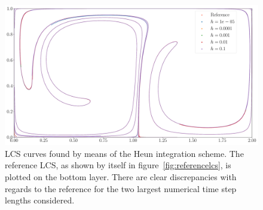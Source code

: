 \begin{figure}[htpb]
    \centering
    \includegraphics[width=0.8\linewidth]{figures/lcs_figures/rk2.pdf}
    \caption[LCS curves found by means of the Heun integration scheme]{
        LCS curves found by means of the Heun integration scheme. The
        reference LCS, as shown by itself in figure~\ref{fig:referencelcs},
        is plotted on the bottom layer. There are clear discrepancies with
        regards to the reference for the two largest numerical time step
        lengths considered.}
    \label{fig:lcs_rk2}
\end{figure}
